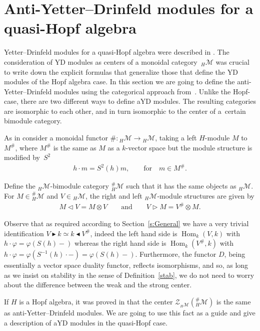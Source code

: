 \documentclass[pdftex]{sigma}
\newcommand{\Zc}{\mathcal{Z}}
\newcommand{\hmod}{{_H\mathcal{M}}}
\newcommand{\hhash}{{^{\#}_H \mathcal{M}}}
\newcommand{\la}{\triangleright}
\newcommand{\ra}{\triangleleft}
\newcommand{\lab}{\blacktriangleright}
\newcommand{\rab}{\blacktriangleleft}
\numberwithin{equation}{section}
\begin{document}
\section{Anti-Yetter--Drinfeld modules for a quasi-Hopf algebra}\label{s:qHopf-ayd}

Yetter--Drinfeld modules for a quasi-Hopf algebra were described in \cite{majid}. The consideration of YD modules as centers of a monoidal category~$\hmod$ was crucial to write down the explicit formulas that generalize those that define the YD modules of the Hopf algebra case. In this section we are going to define the anti-Yetter--Drinfeld modules using the categorical approach from~\cite{hks}. Unlike the Hopf-case, there are two different ways to define aYD modules. The resulting categories are isomorphic to each other, and in turn isomorphic to the center of a~certain bimodule category.

As in \cite{hks} consider a monoidal functor $\#\colon \hmod \rightarrow \hmod $, taking a left $H$-module $M$ to $M^{\#}$, where $M^\#$ is the same as $M$ as a $k$-vector space but the module structure is modified by~$S^2$
 \begin{gather*}
 h \cdot m = S^2(h)m, \qquad \text{for} \quad m \in M^\#.
 \end{gather*}

 Define the $\hmod$-bimodule category $\hhash$ such that it has the same objects as $\hmod$. For $M\in\hhash$ and $V\in\hmod$, the right and left $\hmod$-module structures are given by
 \begin{gather*}
 M \ra V= M\otimes V \qquad \text{and} \qquad V \la M= V^\# \otimes M .
 \end{gather*}

 \begin{Remark}Observe that as required according to Section~\ref{s:General} we have a very trivial identification $V\lab k\simeq k\rab V^{\#}$, indeed the left hand side is $\operatorname{Hom}_k(V,k)$ with $h\cdot\varphi=\varphi(S(h)-)$ whereas the right hand side is $\operatorname{Hom}_k(V^{\#},k)$ with $h\cdot\varphi=\varphi(S^{-1}(h)\cdot-)=\varphi(S(h)-)$. Furthermore, the functor $D$, being essentially a vector space duality functor, reflects isomorphisms, and so, as long as we insist on stability in the sense of Definition~\ref{stab}, we do not need to worry about the difference between the weak and the strong center.
\end{Remark}

If $H$ is a Hopf algebra, it was proved in \cite{hks} that the center $\Zc_\hmod(\hhash) $ is the same as anti-Yetter--Drinfeld modules. We are going to use this fact as a guide and give a description of aYD modules in the quasi-Hopf case.
\end{document}
